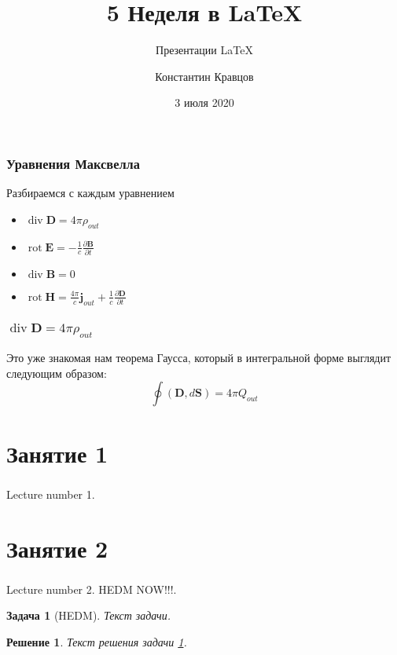\documentclass[t]{beamer}  %
\title{5 Неделя в \LaTeX}
\subtitle{Презентации \LaTeX}
\author{Константин Кравцов}
\date{3 июля 2020}
\institute[МФТИ]{Национальный исследовательский университет \\ <<МФТИ>>}
\newtheorem{rproblem}{Задача}
\newtheorem{rsolve}{Решение}
\DeclareMathOperator{\divergence}{\mathop{div}} %
\DeclareMathOperator{\rot}{\mathop{rot}} %
\begin{document}
\begin{frame}
	\maketitle
\end{frame}

\begin{frame}
	\frametitle{Уравнения Максвелла}
	Разбираемся с каждым уравнением
		\begin{itemize}
		\item $\displaystyle\divergence \textbf{D} = 4\pi\rho_{out}$
		\item $\displaystyle\rot \textbf{E} = - \frac{1}{c} \frac{\partial \textbf{B}}{\partial t}$
		\item $\displaystyle\divergence \textbf{B} = 0$
		\item $\displaystyle\rot \textbf{H} = \frac{4 \pi}{c} \textbf{j}_{out} + \frac{1}{c} \frac{\partial \textbf{D}}{\partial t}$
		\end{itemize}
\end{frame}

\begin{frame}
	\frametitle{$\divergence \textbf{D} = 4\pi\rho_{out}$} %
		Это уже знакомая нам теорема Гаусса, который в интегральной форме выглядит следующим образом:\\
		\[
			\oint \left(\textbf{D}, d\textbf{S}\right) = 4\pi Q_{out}
		\]
\end{frame}


	\section{Занятие 1}
	\begin{frame}
		\frametitle{\insertsection}
		Lecture number 1.	
	\end{frame}
	
	\section{Занятие 2}
	\begin{frame}
		\frametitle{\insertsection}
		Lecture number 2.	
		HEDM NOW!!!.
	\end{frame}

\begin{frame}
	\begin{rproblem}[HEDM]\label{HEDM}
		Текст задачи.
	\end{rproblem}
	\begin{rsolve}
		Текст решения задачи \ref{HEDM}.
	\end{rsolve}
\end{frame}
\end{document}
